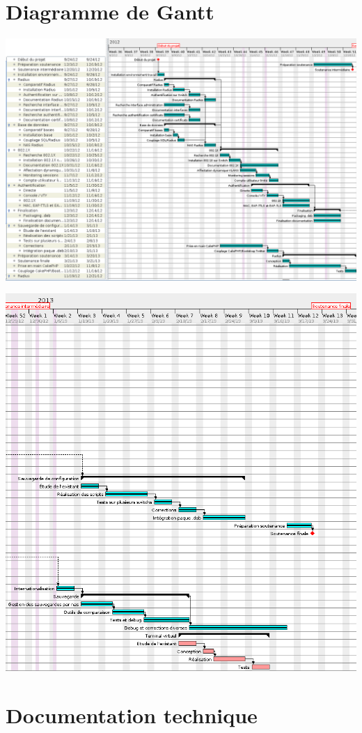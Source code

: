 \section{Diagramme de Gantt}
\label{gantt}
\begin{center}
	\includegraphics[width=\textwidth]{img/gantt1.png}

	\includegraphics[width=\textwidth]{img/gantt2.png}
\end{center}

\section{Documentation technique}
\label{doc-install}



